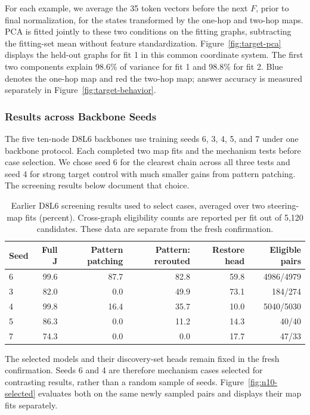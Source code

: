\documentclass{article}
\begin{document}
For each example, we average the 35 token vectors before the next $F$, prior to final normalization, for the states transformed by the one-hop and two-hop maps. PCA is fitted jointly to these two conditions on the fitting graphs, subtracting the fitting-set mean without feature standardization. Figure~\ref{fig:target-pca} displays the held-out graphs for fit 1 in this common coordinate system. The first two components explain 98.6\% of variance for fit 1 and 98.8\% for fit 2. Blue denotes the one-hop map and red the two-hop map; answer accuracy is measured separately in Figure~\ref{fig:target-behavior}.

\subsubsection{Results across Backbone Seeds}
\label{app:n10-selection}
The five ten-node D8L6 backbones use training seeds 6, 3, 4, 5, and 7 under one backbone protocol. Each completed two map fits and the mechanism tests before case selection. We chose seed 6 for the clearest chain across all three tests and seed 4 for strong target control with much smaller gains from pattern patching. The screening results below document that choice.

\begin{table}[!htbp]\centering
\caption{Earlier D8L6 screening results used to select cases, averaged over two steering-map fits (percent). Cross-graph eligibility counts are reported per fit out of 5,120 candidates. These data are separate from the fresh confirmation.}
\begin{tabular}{@{}lrrrrr@{}}\toprule
Seed & Full J & Pattern patching & Pattern: rerouted & Restore head & Eligible pairs\\\midrule
6 & 99.6 & 87.7 & 82.8 & 59.8 & 4986/4979 \\
3 & 82.0 & 0.0 & 49.9 & 73.1 & 184/274 \\
4 & 99.8 & 16.4 & 35.7 & 10.0 & 5040/5030 \\
5 & 86.3 & 0.0 & 11.2 & 14.3 & 40/40 \\
7 & 74.3 & 0.0 & 0.0 & 17.7 & 47/33 \\
\bottomrule\end{tabular}\end{table}

The selected models and their discovery-set heads remain fixed in the fresh confirmation. Seeds 6 and 4 are therefore mechanism cases selected for contrasting results, rather than a random sample of seeds. Figure~\ref{fig:n10-selected} evaluates both on the same newly sampled pairs and displays their map fits separately.
\end{document}
